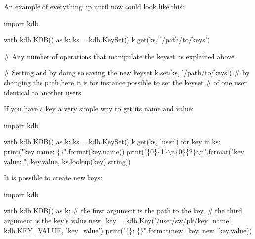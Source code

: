 An example of everything up until now could look like this\+:


\begin{DoxyCode}
\textcolor{keyword}{import} kdb

with \hyperlink{classkdb_1_1KDB}{kdb.KDB}() \textcolor{keyword}{as} k:
    ks = \hyperlink{classkdb_1_1KeySet}{kdb.KeySet}()
    k.get(ks, \textcolor{stringliteral}{'/path/to/keys'})

    \textcolor{comment}{# Any number of operations that manipulate the keyset as explained above}

    \textcolor{comment}{# Setting and by doing so saving the new keyset}
    k.set(ks, \textcolor{stringliteral}{'/path/to/keys'})
    \textcolor{comment}{# by changing the path here it is for instance possible to set the keyset}
    \textcolor{comment}{# of one user identical to another users}
\end{DoxyCode}


If you have a key a very simple way to get its name and value\+:


\begin{DoxyCode}
\textcolor{keyword}{import} kdb

with \hyperlink{classkdb_1_1KDB}{kdb.KDB}() \textcolor{keyword}{as} k:
    ks = \hyperlink{classkdb_1_1KeySet}{kdb.KeySet}()
    k.get(ks, \textcolor{stringliteral}{'user'})
    \textcolor{keywordflow}{for} key \textcolor{keywordflow}{in} ks:
        print(\textcolor{stringliteral}{"key name:  \{\}"}.format(key.name))
        print(\textcolor{stringliteral}{"\{0\}\{1\}\(\backslash\)n\{0\}\{2\}\(\backslash\)n"}.format(\textcolor{stringliteral}{"key value: "}, key.value,
                                        ks.lookup(key).string))
\end{DoxyCode}


It is possible to create new keys\+:


\begin{DoxyCode}
\textcolor{keyword}{import} kdb

with \hyperlink{classkdb_1_1KDB}{kdb.KDB}() \textcolor{keyword}{as} k:
    \textcolor{comment}{# the first argument is the path to the key,}
    \textcolor{comment}{# the third argument is the key's value}
    new\_key = \hyperlink{classkdb_1_1Key}{kdb.Key}(\textcolor{stringliteral}{'/user/sw/pk/key\_name'}, kdb.KEY\_VALUE, \textcolor{stringliteral}{'key\_value'})
    print(\textcolor{stringliteral}{"\{\}: \{\}"}.format(new\_key, new\_key.value))
\end{DoxyCode}


